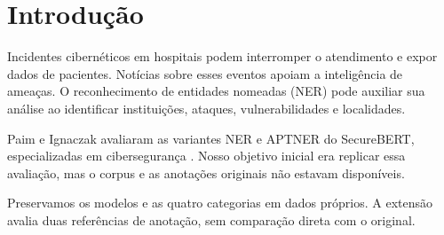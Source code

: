 \section{Introdução}

Incidentes cibernéticos em hospitais podem interromper o atendimento e expor dados de pacientes. Notícias sobre esses eventos apoiam a inteligência de ameaças. O reconhecimento de entidades nomeadas (NER) pode auxiliar sua análise ao identificar instituições, ataques, vulnerabilidades e localidades.

Paim e Ignaczak \cite{paim2025} avaliaram as variantes NER e APTNER do SecureBERT, especializadas em cibersegurança \cite{aghaei2023securebert,wang2022aptner}. Nosso objetivo inicial era replicar essa avaliação, mas o corpus e as anotações originais não estavam disponíveis.

Preservamos os modelos e as quatro categorias em dados próprios. A extensão avalia duas referências de anotação, sem comparação direta com o original.
